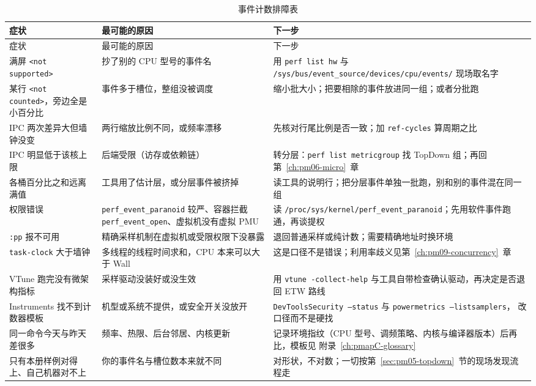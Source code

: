 \documentclass[12pt,a4paper,fontset=fandol]{ctexbook}
\newcommand{\Tp}[1]{\texttt{#1}}
\newcommand{\Bk}{\discretionary{}{}{}}
\newcommand{\Lang}[1]{\textsf{#1}}
\newcommand{\MWall}{\Lang{Wall}}
\newcommand{\MCpu}{\Lang{CPU}}
\newcommand{\Mx}[1]{\textsf{#1}}
\begin{document}
\begin{longtable}{>{\raggedright\arraybackslash}p{} >{\raggedright\arraybackslash}p{} >{\raggedright\arraybackslash}p{}}
\caption{事件计数排障表}\label{tab:pm05-trouble}\\
\hline
症状 & 最可能的原因 & 下一步 \\
\hline
\endfirsthead
\hline
症状 & 最可能的原因 & 下一步 \\
\hline
\endhead
\hline
\endfoot
\hline
\endlastfoot
满屏 \Tp{<not supported>} & 抄了别的 CPU 型号的事件名 &
  用 \Tp{perf list hw} 与 \Tp{/sys/bus/{\Bk}event\_source{\Bk}/devices{\Bk}/cpu{\Bk}/events/}
  现场取名字 \\
某行 \Tp{<not counted>}，旁边全是小百分比 & 事件多于槽位，整组没被调度 &
  缩小批大小；把要相除的事件放进同一组；或者分批跑 \\
\Mx{IPC} 两次差异大但墙钟没变 & 两行缩放比例不同，或频率漂移 &
  先核对行尾比例是否一致；加 \Tp{ref-cycles} 算周期之比 \\
\Mx{IPC} 明显低于该核上限 & 后端受限（访存或依赖链） &
  转分层：\Tp{perf list metricgroup} 找 TopDown 组；再回第~\ref{ch:pm06-micro}~章 \\
各桶百分比之和远离满值 & 工具用了估计层，或分层事件被挤掉 &
  读工具的说明行；把分层事件单独一批跑，别和别的事件混在同一组 \\
权限错误 & \Tp{perf\_event{\Bk}\_paranoid} 较严、容器拦截
  \Tp{perf\_event{\Bk}\_open}、虚拟机没有虚拟 PMU &
  读 \Tp{/proc/{\Bk}sys{\Bk}/kernel/{\Bk}perf\_event\_paranoid}；先用软件事件跑通，再谈提权 \\
\Tp{:pp} 报不可用 & 精确采样机制在虚拟机或受限权限下没暴露 &
  退回普通采样或纯计数；需要精确地址时换环境 \\
\Tp{task-clock} 大于墙钟 & 多线程的线程时间求和，\MCpu{} 本来可以大于 \MWall{} &
  这是口径不是错误；利用率歧义见第~\ref{ch:pm09-concurrency}~章 \\
VTune 跑完没有微架构指标 & 采样驱动没装好或没生效 &
  用 \Tp{vtune -collect-help} 与工具自带检查确认驱动，再决定是否退回 ETW 路线 \\
Instruments 找不到计数器模板 & 机型或系统不提供，或安全开关没放开 &
  \Tp{DevTools{\Bk}Security --status} 与 \Tp{powermetrics --{\Bk}listsamplers}，
  改口径而不是硬找 \\
同一命令今天与昨天差很多 & 频率、热限、后台邻居、内核更新 &
  记录环境指纹（CPU 型号、调频策略、内核与编译器版本）后再比，模板见
  附录~\ref{ch:pmapC-glossary} \\
只有本册样例对得上、自己机器对不上 & 你的事件名与槽位数本来就不同 &
  对形状，不对数；一切按第~\ref{sec:pm05-topdown}~节的现场发现流程走 \\
\end{longtable}
\end{document}
